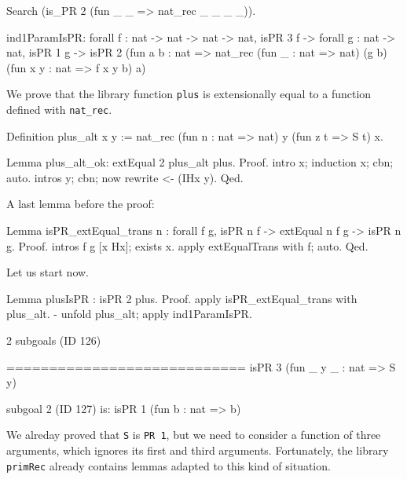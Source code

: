 \begin{Coqsrc}
Search (is_PR 2 (fun _ _ => nat_rec _ _ _ _)).
\end{Coqsrc}

\begin{Coqanswer}
ind1ParamIsPR:
  forall f : nat -> nat -> nat -> nat,
  isPR 3 f ->
  forall g : nat -> nat,
  isPR 1 g ->
  isPR 2
    (fun a b : nat =>
     nat_rec (fun _ : nat => nat)
                 (g b) (fun x y : nat => f x y b) a)
\end{Coqanswer}

We prove that the library function \texttt{plus} is extensionally equal to a function defined with
\texttt{nat\_rec}.

\begin{Coqsrc}
Definition plus_alt x y  :=
              nat_rec  (fun n : nat => nat)
                       y
                       (fun z t =>  S t)
                       x.

Lemma plus_alt_ok:
  extEqual 2 plus_alt plus.
Proof.
  intro x; induction x; cbn; auto.
  intros y; cbn; now rewrite <- (IHx y).
Qed.
\end{Coqsrc}

A last lemma before the proof:

\begin{Coqsrc}
Lemma isPR_extEqual_trans n : forall f g, isPR n f ->
                                    extEqual n f g ->
                                    isPR n g.
Proof.
 intros f g [x Hx]; exists x.
 apply extEqualTrans with f; auto.
Qed.
\end{Coqsrc}

Let us start now.

\begin{Coqsrc}
Lemma plusIsPR : isPR 2 plus.
Proof.
  apply isPR_extEqual_trans with plus_alt.
  - unfold plus_alt; apply ind1ParamIsPR.
\end{Coqsrc}

\begin{Coqanswer}
2 subgoals (ID 126)
  
  ============================
  isPR 3 (fun _ y _ : nat => S y)

subgoal 2 (ID 127) is:
 isPR 1 (fun b : nat => b)
\end{Coqanswer}

We alreday proved that \texttt{S} is \texttt{PR 1}, but we need to consider a function of three arguments, which ignores its first and third arguments.
Fortunately, the library \texttt{primRec} already contains lemmas adapted to this kind of situation.

